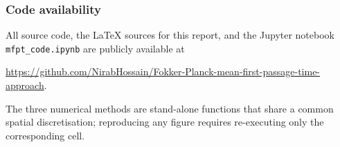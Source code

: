 \subsubsection*{Code availability}
\label{sec:code}

All source code, the LaTeX sources for this report, and the Jupyter notebook
\texttt{mfpt\_code.ipynb} are publicly available at
\begin{center}
    \url{https://github.com/NirabHossain/Fokker-Planck-mean-first-passage-time-approach}.
\end{center}
The three numerical methods are stand-alone functions that share a common
spatial discretisation; reproducing any figure requires re-executing only the
corresponding cell.
